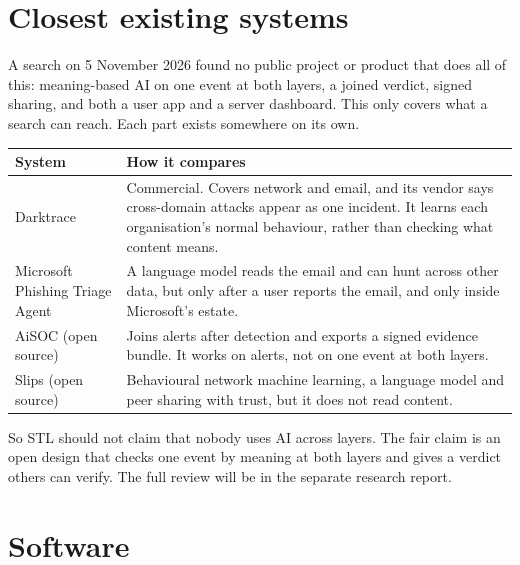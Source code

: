 \documentclass[11pt,a4paper]{article}
\newcommand{\need}[1][10]{\Needspace{#1\baselineskip}}
\begin{document}
\section{Closest existing systems}

A search on 5 November 2026 found no public project or product that does all of this: meaning-based AI on one event at both layers, a joined verdict, signed sharing, and both a user app and a server dashboard. This only covers what a search can reach. Each part exists somewhere on its own.

\need[12]
\begin{center}
\begin{tabularx}{\linewidth}{P{3.6cm}Y}
\toprule
\textbf{System} & \textbf{How it compares} \\
\midrule
Darktrace & Commercial. Covers network and email, and its vendor says cross-domain attacks appear as one incident. It learns each organisation's normal behaviour, rather than checking what content means. \\
Microsoft Phishing Triage Agent & A language model reads the email and can hunt across other data, but only after a user reports the email, and only inside Microsoft's estate. \\
AiSOC (open source) & Joins alerts after detection and exports a signed evidence bundle. It works on alerts, not on one event at both layers. \\
Slips (open source) & Behavioural network machine learning, a language model and peer sharing with trust, but it does not read content. \\
\bottomrule
\end{tabularx}
\end{center}

So STL should not claim that nobody uses AI across layers. The fair claim is an open design that checks one event by meaning at both layers and gives a verdict others can verify. The full review will be in the separate research report.

\section{Software}
\end{document}
